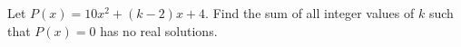 Let $P(x) = 10x^2 +(k -2)x+4$. Find the sum of all integer values of $k$ such that $P(x) = 0$ has no real solutions.
